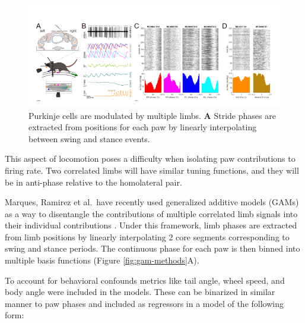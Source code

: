 \begin{figure}[h]
    \centering
    \includegraphics[width=1\linewidth]{Chapters/Figures/chapter3/behavioral_correlations_in_fr.png}
    \caption{Purkinje cells are modulated by multiple limbs. \textbf{A} Stride phases are extracted from positions for each paw by linearly interpolating between swing and stance events.}
    \label{fig:behavioral-correlations}
\end{figure}

\par This aspect of locomotion poses a difficulty when isolating paw contributions to firing rate. Two correlated limbs will have similar tuning functions, and they will be in anti-phase relative to the homolateral pair.



Marques, Ramirez et al.~have recently used generalized additive models (GAMs) as a way to disentangle the contributions of multiple correlated limb signals into their individual contributions \cite{ramirez-buriticaNonlinearMixedEncoding2024}.
Under this framework, limb phases are extracted from limb positions by linearly interpolating 2 core segments corresponding to swing and stance periods. The continuous phase for each paw is then binned into multiple basis functions (Figure \ref{fig:gam-methods}A).


To account for behavioral confounds metrics like tail angle, wheel speed, and body angle were included in the models. These can be binarized in similar manner to paw phases and included as regressors in a model of the following form: 



